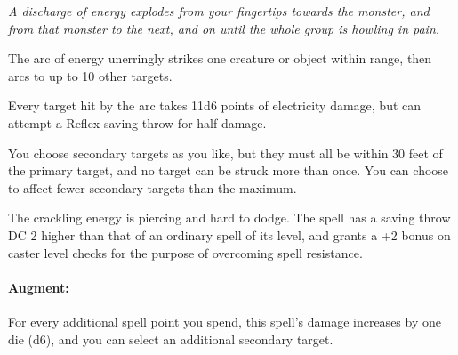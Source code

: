 \emph{A discharge of energy explodes from your fingertips towards the monster, and from that monster to the next, and on until the whole group is howling in pain.}

The arc of energy unerringly strikes one creature or object within range, then arcs to up to 10 other targets.

Every target hit by the arc takes 11d6 points of electricity damage, but can attempt a Reflex saving throw for half damage. 

You choose secondary targets as you like, but they must all be within 30 feet of the primary target, and no target can be struck more than once. 
You can choose to affect fewer secondary targets than the maximum.

The crackling energy is piercing and hard to dodge. The spell has a saving throw DC 2 higher than that of an ordinary spell of its level, and grants a +2 bonus on caster level checks for the purpose of overcoming spell resistance.

\paragraph{Augment:} For every additional spell point you spend, this spell's damage increases by one die (d6), and you can select an additional secondary target.
% 
% 
% 

